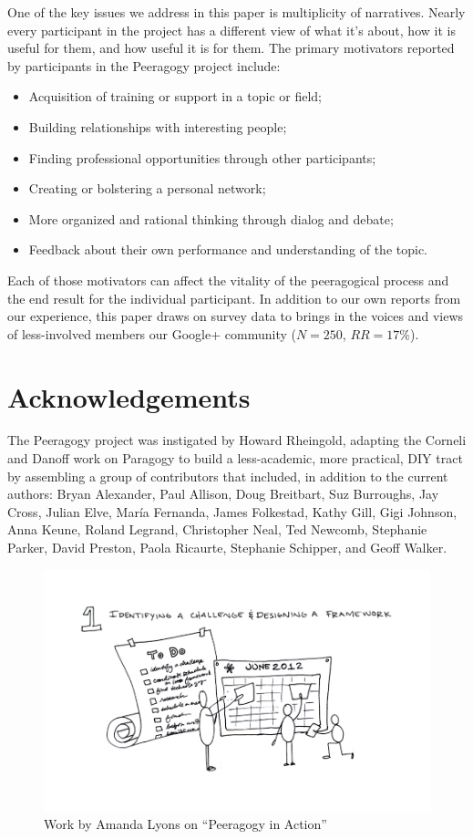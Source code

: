 \documentclass{acm_proc_article-sp}
\begin{document}
One of the key issues we address in this paper is multiplicity of
narratives.  Nearly every participant in the project has a different
view of what it's about, how it is useful for them, and how useful it
is for them.  The primary motivators reported by participants in the
Peeragogy project include:
\begin{itemize}
\item Acquisition of training or support in a topic or field;
\item Building relationships with interesting people;
\item Finding professional opportunities through other participants;
\item Creating or bolstering a personal network;
\item More organized and rational thinking through dialog and debate;
\item Feedback about their own performance and understanding of the
  topic.
\end{itemize}

Each of those motivators can affect the vitality of the peeragogical
process and the end result for the individual participant.  In
addition to our own reports from our experience, this paper draws on
survey data to brings in the voices and views of less-involved members
our Google+ community ($N=250$, $RR=17\%$).

\section{Acknowledgements}

The Peeragogy project was instigated by Howard Rheingold, adapting the
Corneli and Danoff \cite{paragogy} work on Paragogy to build a
less-academic, more practical, DIY tract by assembling a group of contributors
that included, in addition to the current authors: Bryan Alexander,
Paul Allison, Doug Breitbart, Suz Burroughs, Jay Cross, Julian Elve,
Mar\'ia Fernanda, James Folkestad, Kathy Gill, Gigi Johnson, Anna
Keune, Roland Legrand, Christopher Neal, Ted Newcomb, Stephanie
Parker, David Preston, Paola Ricaurte, Stephanie Schipper, and Geoff
Walker.

\begin{figure}
\begin{center}
\includegraphics[width=.5\textwidth]{OpenBook1.jpg}
\vspace{-.7in}
\end{center}
\caption{Work by Amanda Lyons on ``Peeragogy in Action''
  \cite{PeeragogyinAction} \label{amanda}}
\end{figure}
\end{document}
